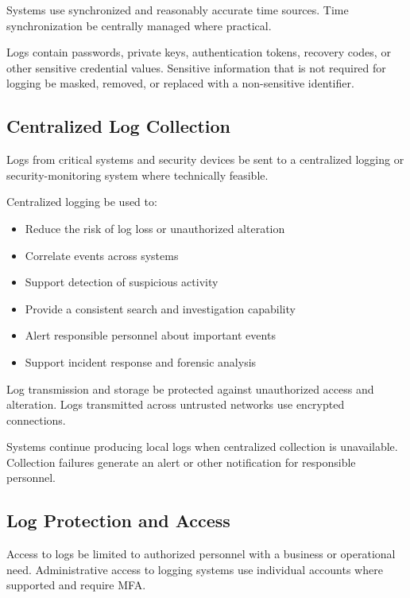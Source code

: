 Systems \must{} use synchronized and reasonably accurate time sources. Time synchronization \should{} be centrally managed where practical.

Logs \mustnot{} contain passwords, private keys, authentication tokens, recovery codes, or other sensitive credential values. Sensitive information that is not required for logging \should{} be masked, removed, or replaced with a non-sensitive identifier.

\subsection{Centralized Log Collection}

Logs from critical systems and security devices \should{} be sent to a centralized logging or security-monitoring system where technically feasible.

Centralized logging \should{} be used to:
\begin{itemize}
    \item Reduce the risk of log loss or unauthorized alteration
    \item Correlate events across systems
    \item Support detection of suspicious activity
    \item Provide a consistent search and investigation capability
    \item Alert responsible personnel about important events
    \item Support incident response and forensic analysis
\end{itemize}

Log transmission and storage \must{} be protected against unauthorized access and alteration. Logs transmitted across untrusted networks \should{} use encrypted connections.

Systems \should{} continue producing local logs when centralized collection is unavailable. Collection failures \should{} generate an alert or other notification for responsible personnel.

\subsection{Log Protection and Access}

Access to logs \must{} be limited to authorized personnel with a business or operational need. Administrative access to logging systems \must{} use individual accounts where supported and \should{} require MFA.

